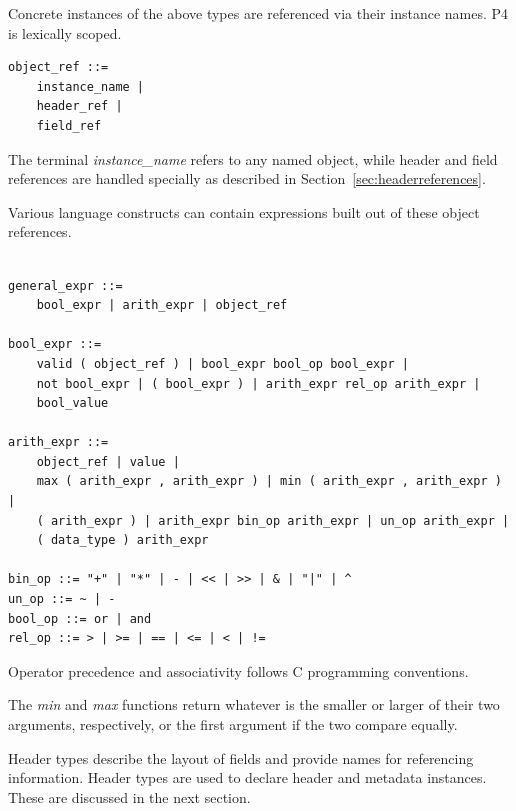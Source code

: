 \documentclass[12pt]{article}
\begin{document}

Concrete instances of the above types are referenced via their instance names.  
P4 is lexically scoped.

\begin{lstlisting}[style=BNFstyle]
object_ref ::=
    instance_name |
    header_ref |
    field_ref
\end{lstlisting}

The terminal \textit{instance_name} refers to any named object, while header 
and field references are handled specially as described in 
Section~\ref{sec:headerreferences}.


Various language constructs can contain expressions built out of these object
references.

\begin{lstlisting}[style=BNFstyle]

general_expr ::= 
    bool_expr | arith_expr | object_ref

bool_expr ::=
    valid ( object_ref ) | bool_expr bool_op bool_expr |
    not bool_expr | ( bool_expr ) | arith_expr rel_op arith_expr |
    bool_value

arith_expr ::=
    object_ref | value | 
    max ( arith_expr , arith_expr ) | min ( arith_expr , arith_expr ) |
    ( arith_expr ) | arith_expr bin_op arith_expr | un_op arith_expr |
    ( data_type ) arith_expr

bin_op ::= "+" | "*" | - | << | >> | & | "|" | ^
un_op ::= ~ | -
bool_op ::= or | and
rel_op ::= > | >= | == | <= | < | !=

\end{lstlisting}

Operator precedence and associativity follows C programming conventions.

The \textit{min} and \textit{max} functions return whatever is the smaller or
larger of their two arguments, respectively, or the first argument if the two 
compare equally.



Header types describe the layout of fields and provide names for referencing 
information. Header types are used to declare header and metadata instances. 
These are discussed in the next section.
\end{document}
